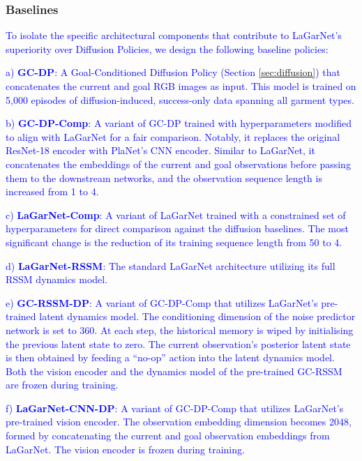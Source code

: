 \documentclass[journal]{IEEEtran}
\newcommand{\addadvantage}[1]{\textcolor{blue}{#1}}
\begin{document}
\subsubsection{Baselines} \label{sec:diff-baselines}

\addadvantage{To isolate the specific architectural components that contribute to LaGarNet's superiority over Diffusion Policies, we design the following baseline policies:}

\addadvantage{a) \textbf{GC-DP}: A Goal-Conditioned Diffusion Policy (Section \ref{sec:diffusion}) that concatenates the current and goal RGB images as input. This model is trained on 5,000 episodes of diffusion-induced, success-only data spanning all garment types.}

\addadvantage{b) \textbf{GC-DP-Comp}: A variant of GC-DP trained with hyperparameters modified to align with LaGarNet for a fair comparison. Notably, it replaces the original ResNet-18 encoder with PlaNet's CNN encoder. Similar to LaGarNet, it concatenates the embeddings of the current and goal observations before passing them to the downstream networks, and the observation sequence length is increased from 1 to 4.}

\addadvantage{c) \textbf{LaGarNet-Comp}: A variant of LaGarNet trained with a constrained set of hyperparameters for direct comparison against the diffusion baselines. The most significant change is the reduction of its training sequence length from 50 to 4.}

\addadvantage{d) \textbf{LaGarNet-RSSM}: The standard LaGarNet architecture utilizing its full RSSM dynamics model.}

\addadvantage{e) \textbf{GC-RSSM-DP}: A variant of GC-DP-Comp that utilizes LaGarNet's pre-trained latent dynamics model. The conditioning dimension of the noise predictor network is set to 360. At each step, the historical memory is wiped by initialising the previous latent state to zero. The current observation's posterior latent state is then obtained by feeding a ``no-op'' action into the latent dynamics model. Both the vision encoder and the dynamics model of the pre-trained GC-RSSM are frozen during training.}

\addadvantage{f) \textbf{LaGarNet-CNN-DP}: A variant of GC-DP-Comp that utilizes LaGarNet's pre-trained vision encoder. The observation embedding dimension becomes 2048, formed by concatenating the current and goal observation embeddings from LaGarNet. The vision encoder is frozen during training.}
\end{document}
